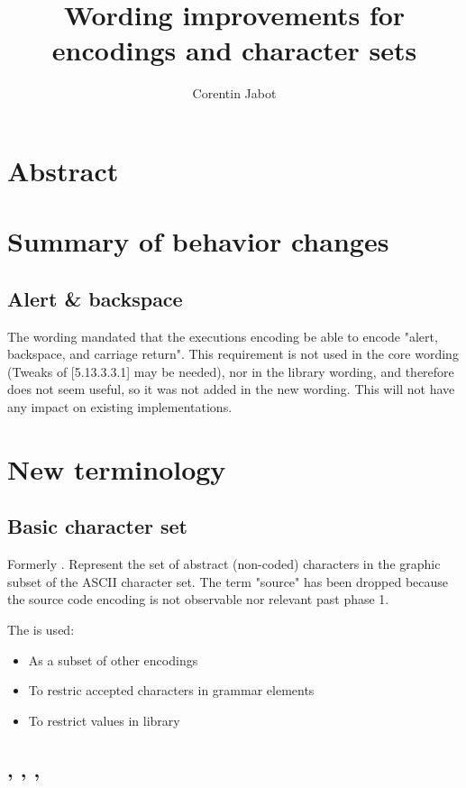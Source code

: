 \documentclass{wg21}
\title{Wording improvements for encodings and character sets}
\author{Corentin Jabot}{corentin.jabot@gmail.com}
\begin{document}
\maketitle


\section{Abstract}


\section{Summary of behavior changes}


\subsection{Alert \& backspace} %

The wording mandated that the executions encoding be able to encode "alert, backspace, and carriage return". This requirement is not used
in the core wording (Tweaks of [5.13.3.3.1] may be needed), nor in the library wording, and therefore does not seem useful, so it was not added in the new wording.
This will not have any impact on existing implementations.

\section{New terminology}

\subsection{Basic character set}

Formerly . Represent the set of abstract (non-coded) characters in the graphic subset of the ASCII character set.
The term "source" has been dropped because the source code encoding is not observable nor relevant past phase 1.

The  is used:
\begin{itemize}
    \item As a subset of other encodings
    \item To restric accepted characters in grammar elements
    \item To restrict values in library
\end{itemize}

\subsection{, , , }
\end{document}
